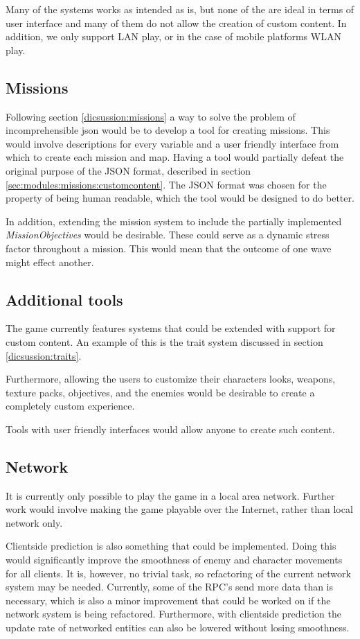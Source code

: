 Many of the systems works as intended as is, but none of the are ideal in terms of user interface and many of them do not allow the creation of custom content.
In addition, we only support LAN play, or in the case of mobile platforms WLAN play.

\subsection{Missions}
Following section \ref{dicsussion:missions} a way to solve the problem of incomprehensible json would be to develop a tool for creating missions.
This would involve descriptions for every variable and a user friendly interface from which to create each mission and map.
Having a tool would partially defeat the original purpose of the JSON format, described in section \ref{sec:modules:missions:customcontent}.
The JSON format was chosen for the property of being human readable, which the tool would be designed to do better.

In addition, extending the mission system to include the partially implemented \textit{MissionObjectives} would be desirable.
These could serve as a dynamic stress factor throughout a mission.
This would mean that the outcome of one wave might effect another.

\subsection{Additional tools}
The game currently features systems that could be extended with support for custom content.
An example of this is the trait system discussed in section \ref{dicsussion:traits}.

Furthermore, allowing the users to customize their characters looks, weapons, texture packs, objectives, and the enemies would be desirable to create a completely custom experience.

Tools with user friendly interfaces would allow anyone to create such content.

\subsection{Network}
It is currently only possible to play the game in a local area network.
Further work would involve making the game playable over the Internet, rather than local network only.

Clientside prediction is also something that could be implemented.
Doing this would significantly improve the smoothness of enemy and character movements for all clients.
It is, however, no trivial task, so refactoring of the current network system may be needed.
Currently, some of the RPC's send more data than is necessary, which is also a minor improvement that could be worked on if the network system is being refactored.
Furthermore, with clientside prediction the update rate of networked entities can also be lowered without losing smoothness.
